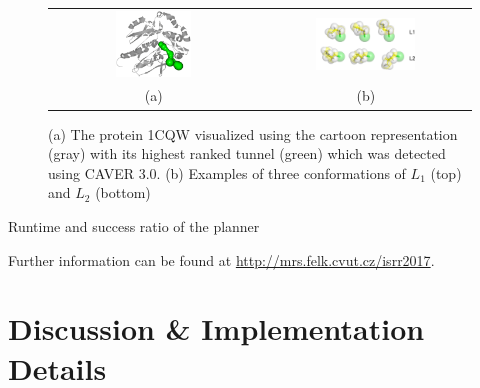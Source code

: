 \documentclass{svmult}
\def\LA{L_1}
\def\LB{L_2}
\begin{document}
\begin{figure}
\centering
\begin{tabular}{cc}
\includegraphics[width=0.38\textwidth]{fig/protein-tunnel-gray} &
\includegraphics[width=0.5\textwidth]{fig/ligAll}  \\
(a) & (b)                        
\end{tabular}                       
\caption{\label{fig::tunnel}
    (a) The protein 1CQW visualized using the cartoon representation (gray) with its highest ranked tunnel (green) which was detected using CAVER 3.0.
    (b) Examples of three conformations of $\LA$ (top) and $\LB$ (bottom)
}
\end{figure}

\begin{table}
\centering
\caption{\label{tab::rrt}
    Runtime and success ratio of the planner
}
{
\renewcommand{\tabcolsep}{1pt}

\hskip 5pt   

}
\end{table}



Further information can be found at {\url{http://mrs.felk.cvut.cz/isrr2017}}.




\section{Discussion \& Implementation Details}
\end{document}
